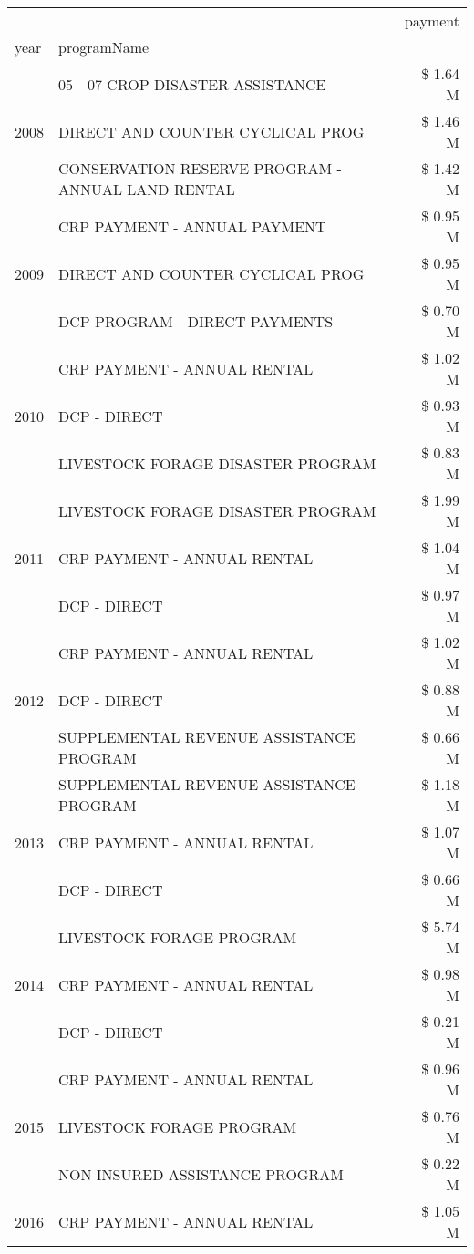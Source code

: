 \begin{tabular}{llr}
\toprule
 &  & payment \\
year & programName &  \\
\midrule
\multirow[t]{3}{*}{2008} & 05 - 07 CROP DISASTER ASSISTANCE & \$ 1.64 M \\
 & DIRECT AND COUNTER CYCLICAL PROG & \$ 1.46 M \\
 & CONSERVATION RESERVE PROGRAM - ANNUAL LAND RENTAL & \$ 1.42 M \\
\cline{1-3}
\multirow[t]{3}{*}{2009} & CRP PAYMENT - ANNUAL PAYMENT & \$ 0.95 M \\
 & DIRECT AND COUNTER CYCLICAL PROG & \$ 0.95 M \\
 & DCP PROGRAM - DIRECT PAYMENTS & \$ 0.70 M \\
\cline{1-3}
\multirow[t]{3}{*}{2010} & CRP PAYMENT - ANNUAL RENTAL & \$ 1.02 M \\
 & DCP - DIRECT & \$ 0.93 M \\
 & LIVESTOCK FORAGE DISASTER PROGRAM & \$ 0.83 M \\
\cline{1-3}
\multirow[t]{3}{*}{2011} & LIVESTOCK FORAGE DISASTER PROGRAM & \$ 1.99 M \\
 & CRP PAYMENT - ANNUAL RENTAL & \$ 1.04 M \\
 & DCP - DIRECT & \$ 0.97 M \\
\cline{1-3}
\multirow[t]{3}{*}{2012} & CRP PAYMENT - ANNUAL RENTAL & \$ 1.02 M \\
 & DCP - DIRECT & \$ 0.88 M \\
 & SUPPLEMENTAL REVENUE ASSISTANCE PROGRAM & \$ 0.66 M \\
\cline{1-3}
\multirow[t]{3}{*}{2013} & SUPPLEMENTAL REVENUE ASSISTANCE PROGRAM & \$ 1.18 M \\
 & CRP PAYMENT - ANNUAL RENTAL & \$ 1.07 M \\
 & DCP - DIRECT & \$ 0.66 M \\
\cline{1-3}
\multirow[t]{3}{*}{2014} & LIVESTOCK FORAGE PROGRAM & \$ 5.74 M \\
 & CRP PAYMENT - ANNUAL RENTAL & \$ 0.98 M \\
 & DCP - DIRECT & \$ 0.21 M \\
\cline{1-3}
\multirow[t]{3}{*}{2015} & CRP PAYMENT - ANNUAL RENTAL & \$ 0.96 M \\
 & LIVESTOCK FORAGE PROGRAM & \$ 0.76 M \\
 & NON-INSURED ASSISTANCE PROGRAM & \$ 0.22 M \\
\cline{1-3}
\multirow[t]{3}{*}{2016} & CRP PAYMENT - ANNUAL RENTAL & \$ 1.05 M \\

\end{tabular}

